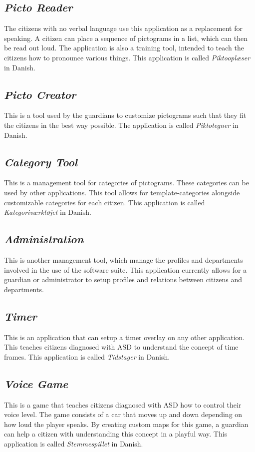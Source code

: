 \subsection*{\emph{Picto Reader}}
\label{sec:app_picto_reader}
The citizens with no verbal language use this application as a replacement for speaking. A citizen can place a sequence of pictograms in a list, which can then be read out loud. The application is also a training tool, intended to teach the citizens how to pronounce various things. This application is called \emph{Piktooplæser} in Danish.

\subsection*{\emph{Picto Creator}}
\label{sec:app_picto_creator}
This is a tool used by the guardians to customize pictograms such that they fit the citizens in the best way possible. The application is called \emph{Piktotegner} in Danish.

\subsection*{\emph{Category Tool}}
\label{sec:app_category_tool}
This is a management tool for categories of pictograms. These categories can be used by other applications. This tool allows for template-categories alongside customizable categories for each citizen. This application is called \emph{Kategoriværktøjet} in Danish.

\subsection*{\emph{Administration}}
\label{sec:app_administration}
This is another management tool, which manage the profiles and departments involved in the use of the \giraf software suite. This application currently allows for a guardian or administrator to setup profiles and relations between citizens and departments.

\subsection*{\emph{Timer}}
\label{sec:app_timer}
This is an application that can setup a timer overlay on any other application. This teaches citizens diagnosed with ASD to understand the concept of time frames. This application is called \emph{Tidstager} in Danish.

\subsection*{\emph{Voice Game}}
\label{sec:app_voice_game}
This is a game that teaches citizens diagnosed with ASD how to control their voice level. The game consists of a car that moves up and down depending on how loud the player speaks. By creating custom maps for this game, a guardian can help a citizen with understanding this concept in a playful way. This application is called \emph{Stemmespillet} in Danish.

